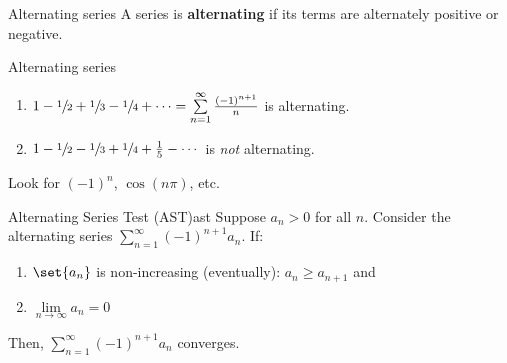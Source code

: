 \begin{Definition}{Alternating series}{}
    A series is \textbf{alternating} if its terms are alternately positive
    or negative.
\end{Definition}

\begin{Example}{Alternating series}{}
    \begin{enumerate}[label=(\roman*)]
        \item $ 1-\sfrac{1}{2}+\sfrac{1}{3} -\sfrac{1}{4} +\cdots=\sum\limits_{n=1}^{\infty}
                  \frac{(-1)^{n+1}}{n} $ is alternating.
        \item $ 1-\sfrac{1}{2} -\sfrac{1}{3} +\sfrac{1}{4} +\frac{1}{5} -\cdots $
              is \emph{not} alternating.
    \end{enumerate}
\end{Example}

\begin{Remark}{}{}
    Look for $ (-1)^n $, $ \cos(n\pi) $, etc.
\end{Remark}

\begin{Theorem}{Alternating Series Test (AST)}{ast}
    Suppose $ a_n>0 $ for all $ n $. Consider the alternating series
    $ \sum\limits_{n=1}^{\infty} (-1)^{n+1}a_n $. If:
    \begin{enumerate}[label=(\arabic*)]
        \item $ \set{a_n} $ is non-increasing (eventually): $ a_n\geqslant a_{n+1} $ and
        \item $ \lim\limits_{{n} \to {\infty}} a_n=0 $
    \end{enumerate}
    Then, $ \sum\limits_{n=1}^{\infty} (-1)^{n+1}a_n $ converges.
\end{Theorem}


